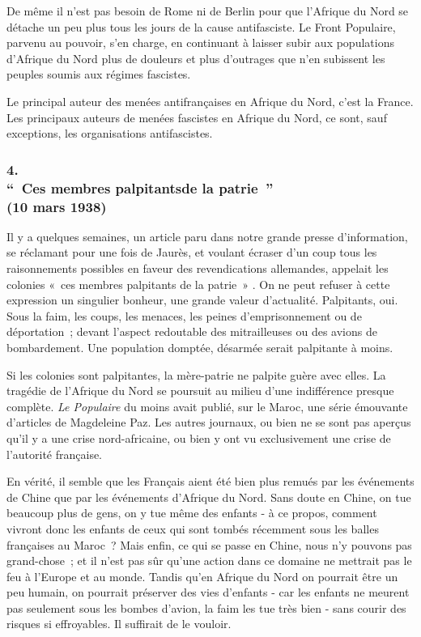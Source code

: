 \documentclass[french,twoside]{book} %
\begin{document}
De même il n'est pas besoin de Rome ni de Berlin pour que l'Afrique du Nord se détache un peu plus tous les jours de la cause antifasciste. Le Front Populaire, parvenu au pouvoir, s'en charge, en continuant à laisser subir aux populations d'Afrique du Nord plus de douleurs et plus d'outrages que n'en subissent les peuples soumis aux régimes fascistes.\par
Le principal auteur des menées antifrançaises en Afrique du Nord, c'est la France. Les principaux auteurs de menées fascistes en Afrique du Nord, ce sont, sauf exceptions, les organisations antifascistes.\par

\subsubsection[{4. “ Ces membres palpitantsde la patrie ”, (10 mars 1938)}]{4. \\
“ Ces membres palpitantsde la patrie ” \\
(10 mars 1938)}
\noindent \par
Il y a quelques semaines, un article paru dans notre grande presse d'information, se réclamant pour une fois de Jaurès, et voulant écraser d'un coup tous les raisonnements possibles en faveur des revendications alleman­des, appelait les colonies « ces membres palpitants de la patrie » . On ne peut refuser à cette expression un singulier bonheur, une grande valeur d'actualité. Palpitants, oui. Sous la faim, les coups, les menaces, les peines d'emprisonne­ment ou de déportation ; devant l'aspect redoutable des mitrailleuses ou des avions de bombardement. Une population domptée, désarmée serait palpitante à moins.\par
Si les colonies sont palpitantes, la mère-patrie ne palpite guère avec elles. La tragédie de l'Afrique du Nord se poursuit au milieu d'une indifférence presque complète. {\itshape Le Populaire} du moins avait publié, sur le Maroc, une série émouvante d'articles de Magdeleine Paz. Les autres journaux, ou bien ne se sont pas aperçus qu'il y a une crise nord-africaine, ou bien y ont vu exclu­sivement une crise de l'autorité française.\par
En vérité, il semble que les Français aient été bien plus remués par les événements de Chine que par les événements d'Afrique du Nord. Sans doute en Chine, on tue beaucoup plus de gens, on y tue même des enfants - à ce propos, comment vivront donc les enfants de ceux qui sont tombés récemment sous les balles françaises au Maroc ? Mais enfin, ce qui se passe en Chine, nous n'y pouvons pas grand-chose ; et il n'est pas sûr qu'une action dans ce domaine ne mettrait pas le feu à l'Europe et au monde. Tandis qu'en Afrique du Nord on pourrait être un peu humain, on pourrait préserver des vies d'enfants - car les enfants ne meurent pas seulement sous les bombes d'avion, la faim les tue très bien - sans courir des risques si effroyables. Il suffirait de le vouloir.\par
\end{document}
